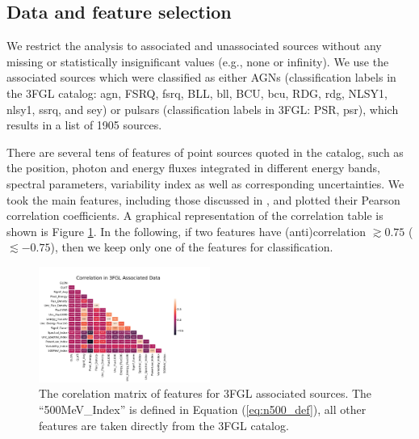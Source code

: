 \subsection{Data and feature selection}

We restrict the analysis to associated and unassociated sources without any missing or statistically insignificant values (e.g., none or infinity). 
We use the associated sources which were classified as either AGNs (classification labels in the 3FGL catalog: agn, FSRQ, fsrq, BLL, bll, BCU, bcu, RDG, rdg, NLSY1, nlsy1, ssrq, and sey) or pulsars (classification labels in 3FGL: PSR, psr), which results in a list of 1905 sources. 


There are several tens of features of point sources quoted in the catalog, such as the position, photon and energy fluxes integrated in different energy bands, spectral parameters, variability index as well as corresponding uncertainties. We took the main features, including those discussed in \cite{2016ApJ...820....8S}, and plotted their Pearson correlation coefficients. A graphical representation of the correlation table is shown is Figure \ref{fig:assoc_corr_3fgli}. In the following, if two features have (anti)correlation $\gtrsim 0.75$ 
($\lesssim -0.75$),
then we keep only one of the features for classification.

\begin{figure}[h]
\center
\includegraphics[width=0.5\textwidth]{plots/3fgl_assoc_cor.pdf}
\caption{The corelation matrix of features for 3FGL associated sources.
The ``500MeV\_Index'' is defined in Equation (\ref{eq:n500_def}), all other features are taken directly 
from the 3FGL catalog.
}
\label{fig:assoc_corr_3fgli}
\end{figure}

